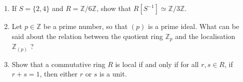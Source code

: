 \documentclass[12pt]{article}
\newcommand{\ZZ}{{\mathbb Z}}
\begin{document}
\begin{enumerate}
%
\item If $S=\{2,4\}$ and $R=\ZZ/6\ZZ$, show that $R[S^{-1}]\simeq \ZZ/3\ZZ$.
\vspace{-2pt}
 
%
\item 
        Let $p\in \ZZ$ be a prime number, so that $(p)$ is a prime ideal.
       What can be said about the relation between the quotient ring $\ZZ_p$ and the
       localisation $\ZZ_{(p)}$ ?
\vspace{-2pt}

     
\item
  Show that a commutative ring $R$ is local if and only if for all $r,s\in R$, if $r+s=1$, then either $r$ or $s$ is a unit. 
 

\end{enumerate}
\end{document}
